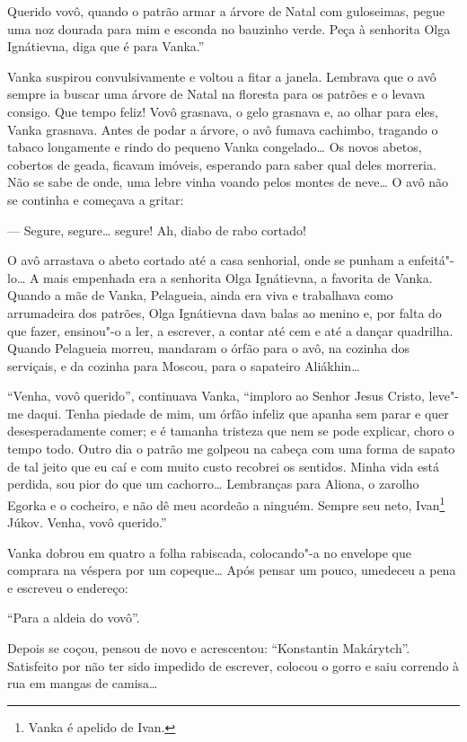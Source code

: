 Querido vovô, quando o patrão armar a árvore de Natal com guloseimas,
pegue uma noz dourada para mim e esconda no bauzinho verde. Peça à
senhorita Olga Ignátievna, diga que é para Vanka.''

Vanka suspirou convulsivamente e voltou a fitar a janela. Lembrava que o
avô sempre ia buscar uma árvore de Natal na floresta para os patrões e o
levava consigo. Que tempo feliz! Vovô grasnava, o gelo grasnava e, ao
olhar para eles, Vanka grasnava. Antes de podar a árvore, o avô fumava
cachimbo, tragando o tabaco longamente e rindo do pequeno Vanka
congelado\ldots{} Os novos abetos, cobertos de geada, ficavam imóveis,
esperando para saber qual deles morreria. Não se sabe de onde, uma lebre
vinha voando pelos montes de neve\ldots{} O avô não se continha e começava a
gritar:

--- Segure, segure\ldots{} segure! Ah, diabo de rabo cortado!

O avô arrastava o abeto cortado até a casa senhorial, onde se punham a
enfeitá"-lo\ldots{} A mais empenhada era a senhorita Olga Ignátievna, a
favorita de Vanka. Quando a mãe de Vanka, Pelagueia, ainda era viva e
trabalhava como arrumadeira dos patrões, Olga Ignátievna dava balas ao
menino e, por falta do que fazer, ensinou"-o a ler, a escrever, a contar
até cem e até a dançar quadrilha. Quando Pelagueia morreu, mandaram o
órfão para o avô, na cozinha dos serviçais, e da cozinha para Moscou,
para o sapateiro Aliákhin\ldots{}

``Venha, vovô querido'', continuava Vanka, ``imploro ao Senhor Jesus
Cristo, leve"-me daqui. Tenha piedade de mim, um órfão infeliz que apanha
sem parar e quer desesperadamente comer; e é tamanha tristeza que nem
se pode explicar, choro o tempo todo. Outro dia o patrão me golpeou na
cabeça com uma forma de sapato de tal jeito que eu caí e com muito
custo recobrei os sentidos. Minha vida está perdida, sou pior do que um
cachorro\ldots{} Lembranças para Aliona, o zarolho Egorka e o cocheiro, e não
dê meu acordeão a ninguém. Sempre seu neto, Ivan\footnote{Vanka é
  apelido de Ivan.} Júkov. Venha, vovô querido.''

Vanka dobrou em quatro a folha rabiscada, colocando"-a no envelope que
comprara na véspera por um copeque\ldots{} Após pensar um pouco, umedeceu a
pena e escreveu o endereço:

``Para a aldeia do vovô''.

Depois se coçou, pensou de novo e acrescentou: ``Konstantin Makárytch''.
Satisfeito por não ter sido impedido de escrever, colocou o gorro e saiu
correndo à rua em mangas de camisa\ldots{}

